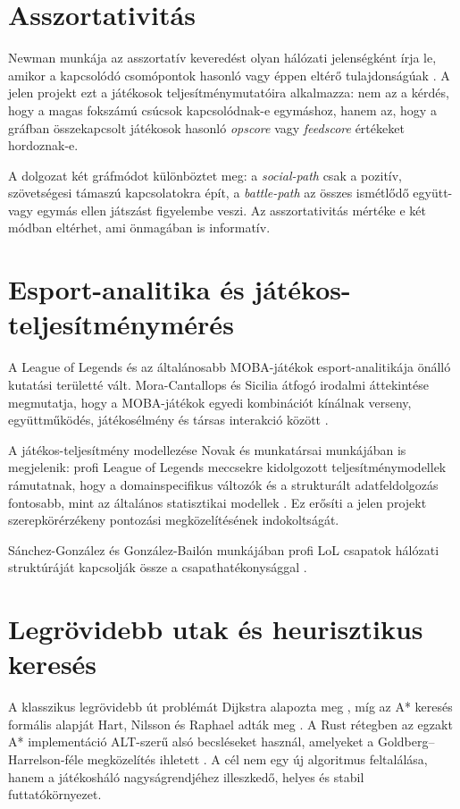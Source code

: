 \section{Asszortativitás}

Newman munkája az asszortatív keveredést olyan hálózati jelenségként írja le, amikor a kapcsolódó csomópontok hasonló vagy éppen eltérő tulajdonságúak \cite{newman2003}. A jelen projekt ezt a játékosok teljesítménymutatóira alkalmazza: nem az a kérdés, hogy a magas fokszámú csúcsok kapcsolódnak-e egymáshoz, hanem az, hogy a gráfban összekapcsolt játékosok hasonló \textit{opscore} vagy \textit{feedscore} értékeket hordoznak-e.

A dolgozat két gráfmódot különböztet meg: a \textit{social-path} csak a pozitív, szövetségesi támaszú kapcsolatokra épít, a \textit{battle-path} az összes ismétlődő együtt- vagy egymás ellen játszást figyelembe veszi. Az asszortativitás mértéke e két módban eltérhet, ami önmagában is informatív.

\section{Esport-analitika és játékos-teljesítménymérés}

A League of Legends és az általánosabb MOBA-játékok esport-analitikája önálló kutatási területté vált. Mora-Cantallops és Sicilia átfogó irodalmi áttekintése megmutatja, hogy a MOBA-játékok egyedi kombinációt kínálnak verseny, együttműködés, játékosélmény és társas interakció között \cite{moracantallops2019}.

A játékos-teljesítmény modellezése Novak és munkatársai munkájában is megjelenik: profi League of Legends meccsekre kidolgozott teljesítménymodellek rámutatnak, hogy a domainspecifikus változók és a strukturált adatfeldolgozás fontosabb, mint az általános statisztikai modellek \cite{novak2022}. Ez erősíti a jelen projekt szerepkörérzékeny pontozási megközelítésének indokoltságát.

Sánchez-González és González-Bailón munkájában profi LoL csapatok hálózati struktúráját kapcsolják össze a csapathatékonysággal \cite{sanchezgonzalezBailon2023}.

\section{Legrövidebb utak és heurisztikus keresés}

A klasszikus legrövidebb út problémát Dijkstra alapozta meg \cite{dijkstra1959}, míg az A* keresés formális alapját Hart, Nilsson és Raphael adták meg \cite{hart1968}. A Rust rétegben az egzakt A* implementáció ALT-szerű alsó becsléseket használ, amelyeket a Goldberg--Harrelson-féle megközelítés ihletett \cite{goldberg2005}. A cél nem egy új algoritmus feltalálása, hanem a játékosháló nagyságrendjéhez illeszkedő, helyes és stabil futtatókörnyezet.

